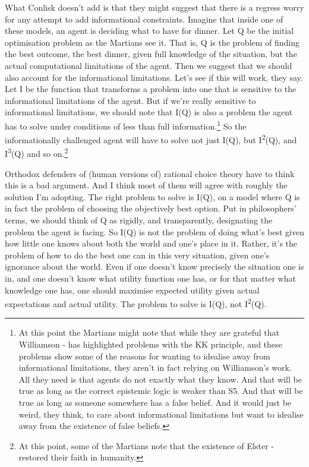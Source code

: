 \documentclass[
  11pt,
]{book}
\begin{document}
What Conlisk doesn't add is that they might suggest that there is a regress worry for any attempt to add informational constraints. Imagine that inside one of these models, an agent is deciding what to have for dinner. Let Q be the initial optimisation problem as the Martians see it. That is, Q is the problem of finding the best outcome, the best dinner, given full knowledge of the situation, but the actual computational limitations of the agent. Then we suggest that we should also account for the informational limitations. Let's see if this will work, they say. Let I be the function that transforms a problem into one that is sensitive to the informational limitations of the agent. But if we're really sensitive to informational limitations, we should note that I(Q) is also a problem the agent has to solve under conditions of less than full information.\footnote{At this point the Martians might note that while they are grateful that Williamson -\citet{Williamson2000} has highlighted problems with the KK principle, and these problems show some of the reasons for wanting to idealise away from informational limitations, they aren't in fact relying on Williamson's work. All they need is that agents do not exactly what they know. And that will be true as long as the correct epistemic logic is weaker than S5. And that will be true as long as someone somewhere has a false belief. And it would just be weird, they think, to care about informational limitations but want to idealise away from the existence of false beliefs.} So the informationally challenged agent will have to solve not just I(Q), but I\textsuperscript{2}(Q), and I\textsuperscript{3}(Q) and so on.\footnote{At this point, some of the Martians note that the existence of Elster -\citet{Elster1979} restored their faith in humanity.}

Orthodox defenders of (human versions of) rational choice theory have to think this is a bad argument. And I think most of them will agree with roughly the solution I'm adopting. The right problem to solve is I(Q), on a model where Q is in fact the problem of choosing the objectively best option. Put in philosophers' terms, we should think of Q as rigidly, and transparently, designating the problem the agent is facing. So I(Q) is not the problem of doing what's best given how little one knows about both the world and one's place in it. Rather, it's the problem of how to do the best one can in this very situation, given one's ignorance about the world. Even if one doesn't know precisely the situation one is in, and one doesn't know what utility function one has, or for that matter what knowledge one has, one should maximise expected utility given actual expectations and actual utility. The problem to solve is I(Q), not I\textsuperscript{2}(Q).
\end{document}

